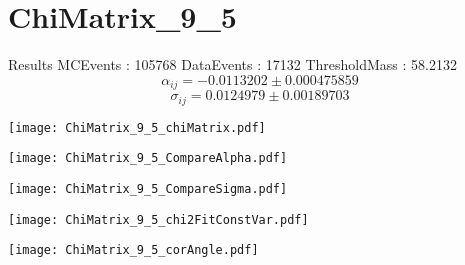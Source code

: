 \documentclass[a4paper,12pt]{article}
\begin{document}
\section{ChiMatrix\_9\_5}
\begin{minipage}{0.49\linewidth} Results \newline
MCEvents : 105768\newline
DataEvents : 17132 \newline
ThresholdMass : 58.2132\\
$$\alpha_{ij} = -0.0113202\pm 0.000475859$$
$$\sigma_{ij} = 0.0124979\pm 0.00189703$$
\end{minipage}\hfill
\begin{minipage}{0.49\linewidth} 
\texttt{[image: ChiMatrix\_9\_5\_chiMatrix.pdf]}\\
\end{minipage}
\hfill
\begin{minipage}{0.49\linewidth} 
\texttt{[image: ChiMatrix\_9\_5\_CompareAlpha.pdf]}\\
\end{minipage}
\hfill
\begin{minipage}{0.49\linewidth} 
\texttt{[image: ChiMatrix\_9\_5\_CompareSigma.pdf]}\\
\end{minipage}
\begin{minipage}{0.49\linewidth} 
\texttt{[image: ChiMatrix\_9\_5\_chi2FitConstVar.pdf]}\\
\end{minipage}
\hfill
\begin{minipage}{0.49\linewidth} 
\texttt{[image: ChiMatrix\_9\_5\_corAngle.pdf]}\\
\end{minipage}
\end{document}

